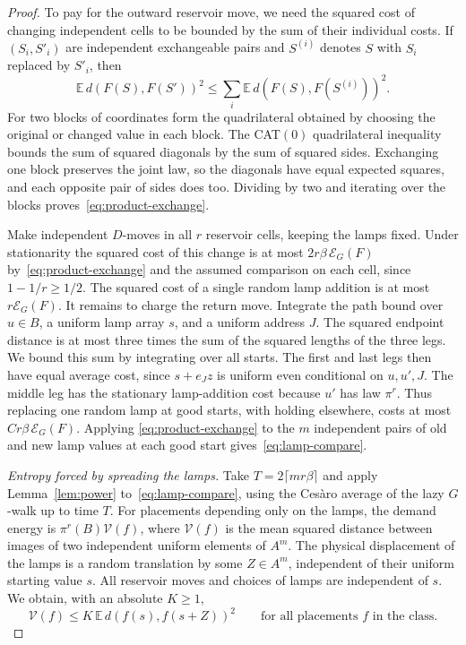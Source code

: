 \begin{proof}
To pay for the outward reservoir move, we need the squared cost of
changing independent cells to be bounded by the sum of their
individual costs. If $(S_i,S'_i)$ are independent exchangeable
pairs and $S^{(i)}$ denotes $S$ with $S_i$ replaced by $S'_i$, then
\begin{equation}\label{eq:product-exchange}
 \mathbb E\,d(F(S),F(S'))^2
 \le\sum_i\mathbb E\,d(F(S),F(S^{(i)}))^2.
\end{equation}
For two blocks of coordinates form the quadrilateral obtained by
choosing the original or changed value in each block. The CAT$(0)$
quadrilateral inequality bounds the sum of squared diagonals by the
sum of squared sides. Exchanging one block preserves the joint law,
so the diagonals have equal expected squares, and each opposite pair
of sides does too. Dividing by two and iterating over the blocks
proves~\eqref{eq:product-exchange}.

Make independent $D$-moves in all $r$ reservoir cells, keeping the
lamps fixed. Under stationarity the squared cost of this change is at
most $2r\beta\,\mathcal E_G(F)$ by~\eqref{eq:product-exchange} and
the assumed comparison on each cell, since $1-1/r\ge1/2$. The squared
cost of a single random lamp addition is at most $r\mathcal E_G(F)$.
It remains to charge the return move. Integrate the path bound over
\(u\in B\), a uniform lamp array \(s\), and a uniform address \(J\).
The squared endpoint distance is at most three times the sum of the
squared lengths of the three legs. We bound this sum by integrating
over all starts. The first and last legs then have equal average cost,
since $s+e_Jz$ is uniform even conditional on $u,u',J$. The middle leg
has the stationary lamp-addition cost because \(u'\) has law \(\pi^r\).
Thus replacing one random lamp at good starts, with holding elsewhere,
costs at most $Cr\beta\,\mathcal E_G(F)$. Applying
\eqref{eq:product-exchange} to the $m$ independent pairs of old and
new lamp values at each good start gives~\eqref{eq:lamp-compare}.

\smallskip\noindent
\emph{Entropy forced by spreading the lamps.}
Take $T=2\lceil mr\beta\rceil$ and apply Lemma~\ref{lem:power}
to~\eqref{eq:lamp-compare}, using the Ces\`aro average of the lazy
$G$-walk up to time $T$. For placements depending only on the lamps,
the demand energy is $\pi^r(B)\mathcal V(f)$, where $\mathcal V(f)$
is the mean squared distance between images of two independent
uniform elements of $A^m$. The physical displacement of the lamps is
a random translation by some $Z\in A^m$, independent of their uniform
starting value $s$. All reservoir moves and choices of lamps are
independent of $s$. We obtain, with an absolute $K\ge1$,
\begin{equation}\label{eq:lamp-translation}
 \mathcal V(f)\le K\,\mathbb E\, d(f(s),f(s+Z))^2
 \qquad\text{for all placements } f \text{ in the class} .
\end{equation}


\end{proof}
